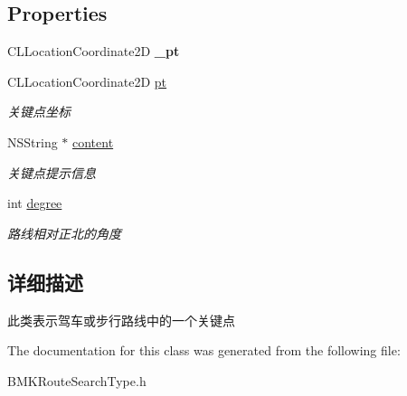 \subsection*{Properties}
\begin{DoxyCompactItemize}
\item 
\hypertarget{interface_b_m_k_step_a230932a6c5fc5fe1f58720c7ecc1db5f}{C\-L\-Location\-Coordinate2\-D {\bfseries \-\_\-pt}}\label{interface_b_m_k_step_a230932a6c5fc5fe1f58720c7ecc1db5f}

\item 
\hypertarget{interface_b_m_k_step_ad517bf5db8d177cb33cd94489dbaac51}{C\-L\-Location\-Coordinate2\-D \hyperlink{interface_b_m_k_step_ad517bf5db8d177cb33cd94489dbaac51}{pt}}\label{interface_b_m_k_step_ad517bf5db8d177cb33cd94489dbaac51}

\begin{DoxyCompactList}\small\item\em 关键点坐标 \end{DoxyCompactList}\item 
\hypertarget{interface_b_m_k_step_a647dc013ca983bb77a6d0f4407ee1d63}{N\-S\-String $\ast$ \hyperlink{interface_b_m_k_step_a647dc013ca983bb77a6d0f4407ee1d63}{content}}\label{interface_b_m_k_step_a647dc013ca983bb77a6d0f4407ee1d63}

\begin{DoxyCompactList}\small\item\em 关键点提示信息 \end{DoxyCompactList}\item 
\hypertarget{interface_b_m_k_step_a072bddb98bea4d5da2d6a5f54df46599}{int \hyperlink{interface_b_m_k_step_a072bddb98bea4d5da2d6a5f54df46599}{degree}}\label{interface_b_m_k_step_a072bddb98bea4d5da2d6a5f54df46599}

\begin{DoxyCompactList}\small\item\em 路线相对正北的角度 \end{DoxyCompactList}\end{DoxyCompactItemize}


\subsection{详细描述}
此类表示驾车或步行路线中的一个关键点 

The documentation for this class was generated from the following file\-:\begin{DoxyCompactItemize}
\item 
B\-M\-K\-Route\-Search\-Type.\-h\end{DoxyCompactItemize}
